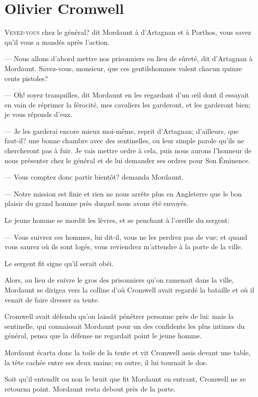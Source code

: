 \chapter{Olivier Cromwell}

\lettrine[ante=—]{V}{enez-vous} chez le général? dit Mordaunt à d'Artagnan et à Porthos, vous savez qu'il vous a mandés après l'action.

\zz
— Nous allons d'abord mettre nos prisonniers en lieu de sûreté, dit d'Artagnan à Mordaunt. Savez-vous, monsieur, que ces gentilshommes valent chacun quinze cents pistoles?

— Oh! soyez tranquilles, dit Mordaunt en les regardant d'un œil dont il essayait en vain de réprimer la férocité, mes cavaliers les garderont, et les garderont bien; je vous réponds d'eux.

— Je les garderai encore mieux moi-même, reprit d'Artagnan; d'ailleurs, que faut-il? une bonne chambre avec des sentinelles, ou leur simple parole qu'ils ne chercheront pas à fuir. Je vais mettre ordre à cela, puis nous aurons l'honneur de nous présenter chez le général et de lui demander ses ordres pour Son Éminence.

— Vous comptez donc partir bientôt? demanda Mordaunt.

— Notre mission est finie et rien ne nous arrête plus en Angleterre que le bon plaisir du grand homme près duquel nous avons été envoyés.

Le jeune homme se mordit les lèvres, et se penchant à l'oreille du sergent:

— Vous suivrez ces hommes, lui dit-il, vous ne les perdrez pas de vue; et quand vous saurez où ils sont logés, vous reviendrez m'attendre à la porte de la ville.

Le sergent fit signe qu'il serait obéi.

Alors, au lieu de suivre le gros des prisonniers qu'on ramenait dans la ville, Mordaunt se dirigea vers la colline d'où Cromwell avait regardé la bataille et où il venait de faire dresser sa tente.

Cromwell avait défendu qu'on laissât pénétrer personne près de lui: mais la sentinelle, qui connaissait Mordaunt pour un des confidents les plus intimes du général, pensa que la défense ne regardait point le jeune homme.

Mordaunt écarta donc la toile de la tente et vit Cromwell assis devant une table, la tête cachée entre ses deux mains; en outre, il lui tournait le dos.

Soit qu'il entendît ou non le bruit que fit Mordaunt en entrant, Cromwell ne se retourna point.
Mordaunt resta debout près de la porte.

